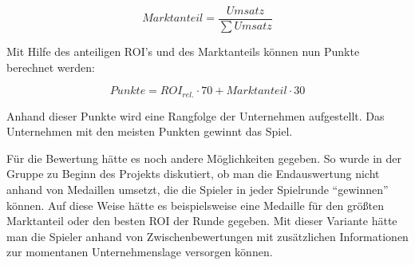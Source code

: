 \begin{equation}
     Marktanteil = \frac{Umsatz}{\sum Umsatz}
     \label{alg:spielwelt-logik-bewertung-Marktanteil}
\end{equation}

Mit Hilfe des anteiligen ROI's und des Marktanteils können nun Punkte berechnet werden:

\begin{equation}
     Punkte = ROI_{rel.} \cdot 70 + Marktanteil \cdot 30
     \label{alg:spielwelt-logik-bewertung-Punkte}
\end{equation}

Anhand dieser Punkte wird eine Rangfolge der Unternehmen aufgestellt. Das Unternehmen mit den meisten Punkten gewinnt das
Spiel.

\bigskip

Für die Bewertung hätte es noch andere Möglichkeiten gegeben. So wurde in der Gruppe zu Beginn des Projekts diskutiert,
ob man die Endauswertung nicht anhand von Medaillen umsetzt, die die Spieler in jeder Spielrunde “gewinnen” können. Auf
diese Weise hätte es beispielsweise eine Medaille für den größten Marktanteil oder den besten ROI der Runde gegeben. Mit
dieser Variante hätte man die Spieler anhand von Zwischenbewertungen mit zusätzlichen Informationen zur momentanen
Unternehmenslage versorgen können.

\autorende{}